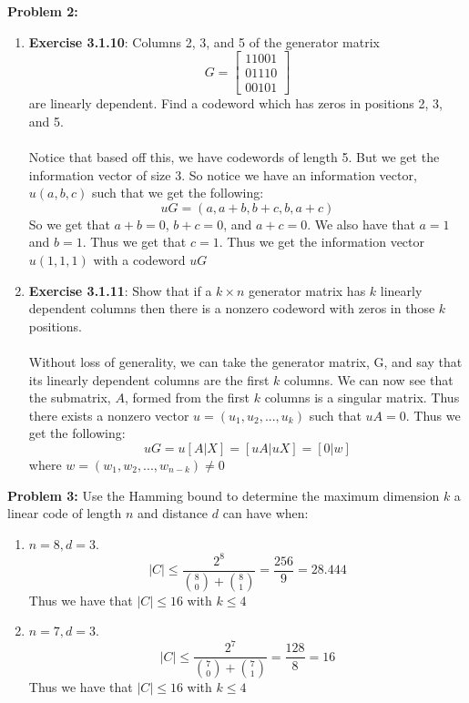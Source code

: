 \documentclass[11pt]{article}
\newcommand{\skipline}{\vspace{\baselineskip}}
\newenvironment{problem}[1]{\textbf{Problem #1: }}{\newpage}
\begin{document}
	\begin{problem}{2}
		\begin{enumerate}[label = (\alph*)]
			\item \textbf{Exercise 3.1.10}: 
			Columns 2, 3, and 5 of the generator matrix
			\[G = \begin{bmatrix}
				11001 \\ 01110 \\ 00101
			\end{bmatrix}\]
			are linearly dependent. Find a codeword which has zeros in positions 2, 3, and 5.
			\\ \\
			Notice that based off this, we have codewords of length 5.  But we get the information vector of size 3.  So notice we have an information vector, $u(a,b,c)$ such that we get the following:
			\[uG = \left(a, a + b, b + c, b, a + c\right)\]
			So we get that $a + b = 0$, $b + c = 0$, and $a + c = 0$.  We also have that $a = 1$ and $b = 1$.  Thus we get that $c = 1$.  Thus we get the information vector $u(1,1,1)$ with a codeword $uG$
			\skipline
			\item \textbf{Exercise 3.1.11}: 
			Show that if a $k \times n$ generator matrix has $k$ linearly dependent columns then there is a nonzero codeword with zeros in those $k$ positions.
			\\ \\
			Without loss of generality, we can take the generator matrix, G, and say that its linearly dependent columns are the first $k$ columns.  We can now see that the submatrix, $A$, formed from the first $k$ columns is a singular matrix.  Thus there exists a nonzero vector $u = (u_1, u_2, ..., u_k)$ such that $uA = 0$.  Thus we get the following:
			\[uG = u\left[A|X\right] = \left[uA|uX\right] = \left[0 | w\right]\]
			where $w = (w_1, w_2, ...,w_{n-k}) \not = 0$
		\end{enumerate}
	\end{problem}

	\begin{problem}{3}
		Use the Hamming bound to determine the maximum dimension $k$ a linear code of length $n$ and distance $d$ can have when:
		\begin{enumerate}[label = (\alph*)]
			\item $n = 8, d = 3$.
			\[|C| \leq \frac{2^8}{\binom{8}{0} + \binom{8}{1}} = \frac{256}{9} = 28.444\]
			Thus we have that $|C| \leq 16$ with $k \leq 4$
			\item $n = 7, d = 3$.
			\[|C| \leq \frac{2^7}{\binom{7}{0} + \binom{7}{1}} = \frac{128}{8} = 16\]
			Thus we have that $|C| \leq 16$ with $k \leq 4$
		\end{enumerate}
	\end{problem}
\end{document}
